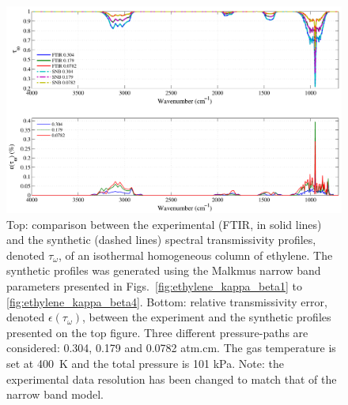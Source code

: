 \begin{figure}[p]
\includegraphics[width=\textwidth]{Figures/Comparison_Fit_Ethylene_MALKMUS_Temp400K.pdf}
\caption{Top: comparison between the experimental (FTIR, in solid lines) and the synthetic (dashed lines) spectral transmissivity profiles, denoted $\tau_{\omega}$, of an isothermal homogeneous column of ethylene. The synthetic profiles was generated using the Malkmus narrow band parameters presented in Figs.~\ref{fig:ethylene_kappa_beta1} to \ref{fig:ethylene_kappa_beta4}. Bottom: relative transmissivity error, denoted $\epsilon{(\tau_{\omega})}$, between the experiment and the synthetic profiles presented on the top figure. Three different pressure-paths are considered: 0.304, 0.179 and 0.0782 atm.cm. The gas temperature is set at 400~K and the total pressure is 101 kPa. Note: the experimental data resolution has been changed to match that of the narrow band model. \label{fig:ethylene_SNBVerify_400K}}
\end{figure}


